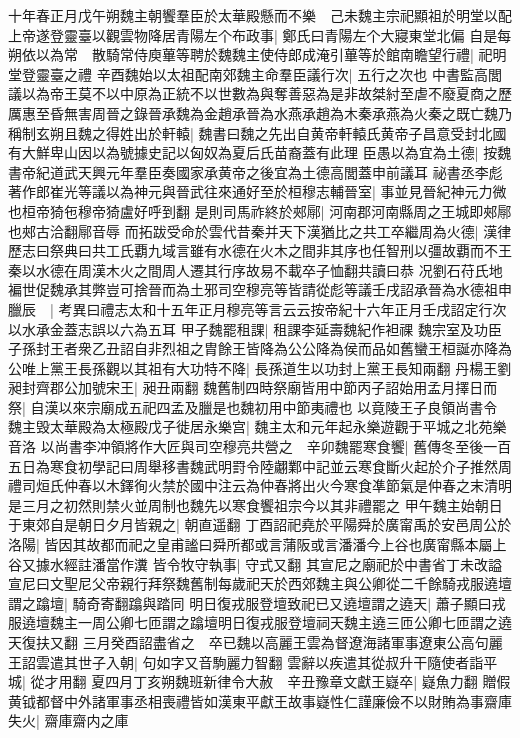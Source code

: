 十年春正月戊午朔魏主朝饗羣臣於太華殿懸而不樂　己未魏主宗祀顯祖於明堂以配上帝遂登靈臺以觀雲物降居青陽左个布政事|{
	鄭氏曰青陽左个大寢東堂北偏}
自是每朔依以為常　散騎常侍庾蓽等聘於魏魏主使侍郎成淹引蓽等於館南瞻望行禮|{
	祀明堂登靈臺之禮}
辛酉魏始以太祖配南郊魏主命羣臣議行次|{
	五行之次也}
中書監高閭議以為帝王莫不以中原為正統不以世數為與奪善惡為是非故桀紂至虐不廢夏商之歷厲惠至昏無害周晉之錄晉承魏為金趙承晉為水燕承趙為木秦承燕為火秦之既亡魏乃稱制玄朔且魏之得姓出於軒轅|{
	魏書曰魏之先出自黄帝軒轅氏黄帝子昌意受封北國有大鮮卑山因以為號據史記以匈奴為夏后氏苗裔蓋有此理}
臣愚以為宜為土德|{
	按魏書帝紀道武天興元年羣臣奏國家承黄帝之後宜為土德高閭蓋申前議耳}
祕書丞李彪著作郎崔光等議以為神元與晉武往來通好至於桓穆志輔晉室|{
	事並見晉紀神元力微也桓帝猗㐌穆帝猗盧好呼到翻}
是則司馬祚終於郟鄏|{
	河南郡河南縣周之王城即郟鄏也郟古洽翻鄏音辱}
而拓跋受命於雲代昔秦并天下漢猶比之共工卒繼周為火德|{
	漢律歷志曰祭典曰共工氏覇九域言雖有水德在火木之間非其序也任智刑以彊故覇而不王秦以水德在周漢木火之間周人遷其行序故易不載卒子恤翻共讀曰恭}
况劉石苻氏地褊世促魏承其弊豈可捨晉而為土邪司空穆亮等皆請從彪等議壬戌詔承晉為水德祖申臘辰　|{
	考異曰禮志太和十五年正月穆亮等言云云按帝紀十六年正月壬戌詔定行次以水承金蓋志誤以六為五耳}
甲子魏罷租課|{
	租課李延壽魏紀作袒祼}
魏宗室及功臣子孫封王者衆乙丑詔自非烈祖之胄餘王皆降為公公降為侯而品如舊蠻王桓誕亦降為公唯上黨王長孫觀以其祖有大功特不降|{
	長孫道生以功封上黨王長知兩翻}
丹楊王劉昶封齊郡公加號宋王|{
	昶丑兩翻}
魏舊制四時祭廟皆用中節丙子詔始用孟月擇日而祭|{
	自漢以來宗廟成五祀四孟及臘是也魏初用中節夷禮也}
以竟陵王子良領尚書令　魏主毁太華殿為太極殿戊子徙居永樂宫|{
	魏主太和元年起永樂遊觀于平城之北苑樂音洛}
以尚書李冲領將作大匠與司空穆亮共營之　辛卯魏罷寒食饗|{
	舊傳冬至後一百五日為寒食初學記曰周舉移書魏武明罸令陸翽鄴中記並云寒食斷火起於介子推然周禮司烜氏仲春以木鐸徇火禁於國中注云為仲春將出火今寒食凖節氣是仲春之末清明是三月之初然則禁火並周制也魏先以寒食饗祖宗今以其非禮罷之}
甲午魏主始朝日于東郊自是朝日夕月皆親之|{
	朝直遥翻}
丁酉詔祀堯於平陽舜於廣甯禹於安邑周公於洛陽|{
	皆因其故都而祀之皇甫謐曰舜所都或言蒲阪或言潘潘今上谷也廣甯縣本屬上谷又據水經註潘當作瀵}
皆令牧守執事|{
	守式又翻}
其宣尼之廟祀於中書省丁未改謚宣尼曰文聖尼父帝親行拜祭魏舊制每歲祀天於西郊魏主與公卿從二千餘騎戎服遶壇謂之蹹壇|{
	騎奇寄翻蹹與踏同}
明日復戎服登壇致祀已又遶壇謂之遶天|{
	蕭子顯曰戎服遶壇魏主一周公卿七匝謂之蹹壇明日復戎服登壇祠天魏主遶三匝公卿七匝謂之遶天復扶又翻}
三月癸酉詔盡省之　卒已魏以高麗王雲為督遼海諸軍事遼東公高句麗王詔雲遣其世子入朝|{
	句如字又音駒麗力智翻}
雲辭以疾遣其從叔升干隨使者詣平城|{
	從才用翻}
夏四月丁亥朔魏班新律令大赦　辛丑豫章文獻王嶷卒|{
	嶷魚力翻}
贈假黄钺都督中外諸軍事丞相喪禮皆如漢東平獻王故事嶷性仁謹廉儉不以財賄為事齋庫失火|{
	齋庫齋内之庫}
